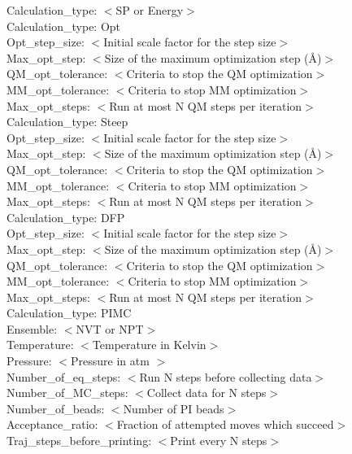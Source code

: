 \documentclass[12pt]{report}
\begin{document}
Calculation\_type: $<$SP or Energy$>$ \\

Calculation\_type: Opt \\
Opt\_step\_size: $<$Initial scale factor for the step size$>$ \\
Max\_opt\_step: $<$Size of the maximum optimization step (\AA)$>$ \\
QM\_opt\_tolerance: $<$Criteria to stop the QM optimization$>$\\
MM\_opt\_tolerance: $<$Criteria to stop MM optimization$>$ \\
Max\_opt\_steps: $<$Run at most N QM steps per iteration$>$ \\

Calculation\_type: Steep \\
Opt\_step\_size: $<$Initial scale factor for the step size$>$ \\
Max\_opt\_step: $<$Size of the maximum optimization step (\AA)$>$
QM\_opt\_tolerance: $<$Criteria to stop the QM optimization$>$\\
MM\_opt\_tolerance: $<$Criteria to stop MM optimization$>$ \\
Max\_opt\_steps: $<$Run at most N QM steps per iteration$>$ \\

Calculation\_type: DFP \\
Opt\_step\_size: $<$Initial scale factor for the step size$>$ \\
Max\_opt\_step: $<$Size of the maximum optimization step (\AA)$>$
QM\_opt\_tolerance: $<$Criteria to stop the QM optimization$>$\\
MM\_opt\_tolerance: $<$Criteria to stop MM optimization$>$ \\
Max\_opt\_steps: $<$Run at most N QM steps per iteration$>$ \\

Calculation\_type: PIMC \\
Ensemble: $<$NVT or NPT$>$ \\
Temperature: $<$Temperature in Kelvin$>$ \\
Pressure: $<$Pressure in atm $>$ \\
Number\_of\_eq\_steps: $<$Run N steps before collecting data$>$ \\
Number\_of\_MC\_steps: $<$Collect data for N steps$>$ \\
Number\_of\_beads: $<$Number of PI beads$>$ \\
Acceptance\_ratio: $<$Fraction of attempted moves which succeed$>$ \\
Traj\_steps\_before\_printing: $<$Print every N steps$>$ \\
\end{document}
